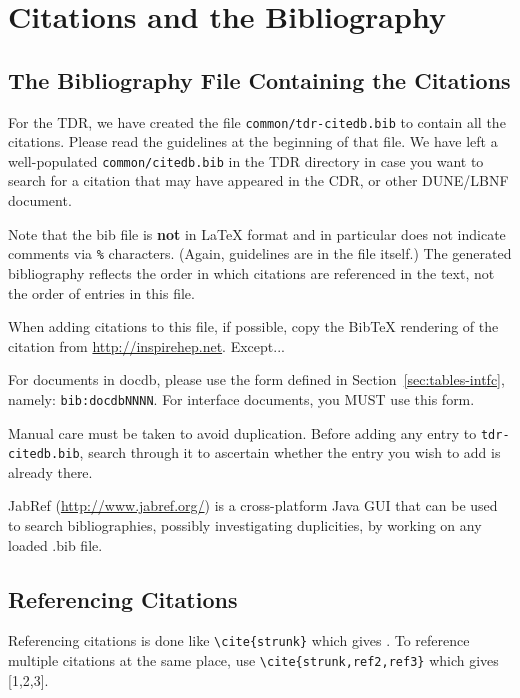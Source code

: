 \section{Citations and the Bibliography}
\label{sec:latex-cit}

\subsection{The Bibliography File Containing the Citations}
\label{sec:latex-bib-file}

For the TDR, we have created the file \texttt{common/tdr-citedb.bib} to contain all the citations. Please read the guidelines at the
beginning of that file. We have left a well-populated \texttt{common/citedb.bib} in the TDR directory in case you want to search for a citation
 that may have appeared in the CDR, or other DUNE/LBNF document.

Note that the bib file is \textbf{not} in \LaTeX{} format and in particular does not
indicate comments via \texttt{\%} characters. (Again, guidelines are in the file itself.)
The
generated bibliography reflects the order in which citations are referenced in the text, not the order of entries in this file.

When adding citations to this file, if possible, copy the BibTeX rendering of the citation from \url{http://inspirehep.net}.  Except...

For documents in docdb, please use the form defined in Section~\ref{sec:tables-intfc}, namely: \verb|bib:docdbNNNN|. For interface documents, you MUST use this form.

Manual care must be taken to avoid duplication. %
Before adding any entry to \texttt{tdr-citedb.bib}, search through it
to ascertain whether the entry you wish to add is already there.

JabRef (\url{http://www.jabref.org/}) is a cross-platform Java GUI that can be used to search bibliographies, possibly investigating duplicities, by working on any loaded .bib file.

\subsection{Referencing Citations}
\label{sec:latex-ref}

Referencing citations is done like \verb|\cite{strunk}| which gives \cite{strunk}.
To reference multiple citations at the same place, use \verb|\cite{strunk,ref2,ref3}| which gives  [1,2,3].

